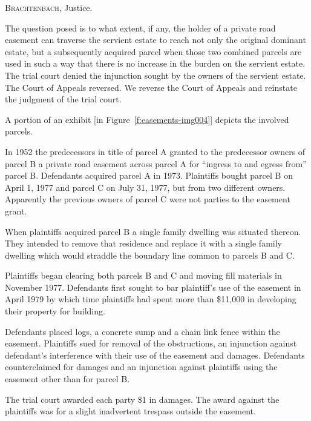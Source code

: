 

\opinion \textsc{Brachtenbach}, Justice.

The question posed is to what extent, if any, the holder of a private road
easement can traverse the servient estate to reach not only the original
dominant estate, but a subsequently acquired parcel when those two combined
parcels are used in such a way that there is no increase in the burden on the
servient estate. The trial court denied the injunction sought by the owners of
the servient estate. The Court of Appeals reversed. We reverse the Court of
Appeals and reinstate the judgment of the trial court.

A portion of an exhibit [in Figure~\ref{f:easements-img004}] depicts the
involved parcels.


In 1952 the predecessors in title of parcel A granted to the predecessor owners
of parcel B a private road easement across parcel A for ``ingress to and egress
from'' parcel B. Defendants acquired parcel A in 1973. Plaintiffs bought parcel
B on April 1, 1977 and parcel C on July 31, 1977, but from two different owners.
Apparently the previous owners of parcel C were not parties to the easement
grant.

When plaintiffs acquired parcel B a single family dwelling was situated thereon.
They intended to remove that residence and replace it with a single family
dwelling which would straddle the boundary line common to parcels B and C.

Plaintiffs began clearing both parcels B and C and moving fill materials in
November 1977. Defendants first sought to bar plaintiff's use of the easement in
April 1979 by which time plaintiffs had spent more than \$11,000 in developing
their property for building.

Defendants placed logs, a concrete sump and a chain link fence within the
easement. Plaintiffs sued for removal of the obstructions, an injunction against
defendant's interference with their use of the easement and damages. Defendants
counterclaimed for damages and an injunction against plaintiffs using the
easement other than for parcel B.

The trial court awarded each party \$1 in damages. The award against the
plaintiffs was for a slight inadvertent trespass outside the easement.

